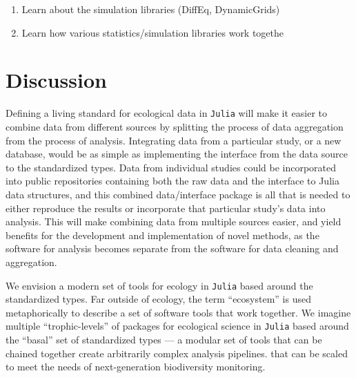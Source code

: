 \documentclass[11pt]{article}
\begin{document}
\begin{enumerate}
\def\labelenumi{\arabic{enumi}.}
\setcounter{enumi}{7}
\tightlist
\item
  Learn about the simulation libraries (DiffEq, DynamicGrids)
\item
  Learn how various statistics/simulation libraries work togethe
\end{enumerate}

\hypertarget{discussion}{%
\section{Discussion}\label{discussion}}

Defining a living standard for ecological data in \texttt{Julia} will
make it easier to combine data from different sources by splitting the
process of data aggregation from the process of analysis. Integrating
data from a particular study, or a new database, would be as simple as
implementing the interface from the data source to the standardized
types. Data from individual studies could be incorporated into public
repositories containing both the raw data and the interface to Julia
data structures, and this combined data/interface package is all that is
needed to either reproduce the results or incorporate that particular
study's data into analysis. This will make combining data from multiple
sources easier, and yield benefits for the development and
implementation of novel methods, as the software for analysis becomes
separate from the software for data cleaning and aggregation.

We envision a modern set of tools for ecology in \texttt{Julia} based
around the standardized types. Far outside of ecology, the term
``ecosystem'' is used metaphorically to describe a set of software tools
that work together. We imagine multiple ``trophic-levels'' of packages
for ecological science in \texttt{Julia} based around the ``basal'' set
of standardized types --- a modular set of tools that can be chained
together create arbitrarily complex analysis pipelines. that can be
scaled to meet the needs of next-generation biodiversity monitoring.
\end{document}
